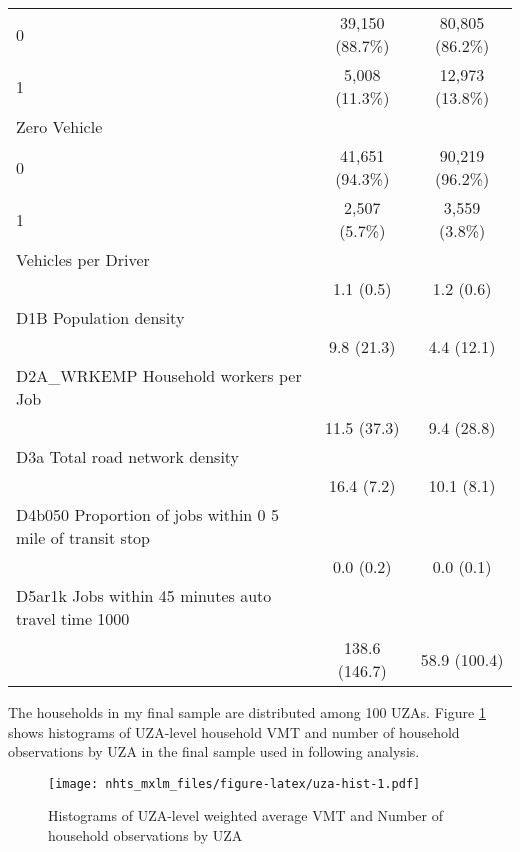 \documentclass[numbered]{trbunofficial}
\begin{document}
\begin{table}[ !h ]
\begin{tabular}{ l c c }
\hspace{6pt}    0 & 39,150 (88.7\%) & 80,805 (86.2\%)\\ 
\hspace{6pt}    1 & 5,008 (11.3\%) & 12,973 (13.8\%)\\ 
Zero Vehicle &   &  \\ 
\hspace{6pt}    0 & 41,651 (94.3\%) & 90,219 (96.2\%)\\ 
\hspace{6pt}    1 & 2,507 (5.7\%) & 3,559 (3.8\%)\\ 
Vehicles per Driver &   &  \\ 
\hspace{6pt}   & 1.1 (0.5) & 1.2 (0.6)\\ 
D1B   Population density &   &  \\ 
\hspace{6pt}   & 9.8 (21.3) & 4.4 (12.1)\\ 
D2A\_WRKEMP   Household workers per Job &   &  \\ 
\hspace{6pt}   & 11.5 (37.3) & 9.4 (28.8)\\ 
D3a   Total road network density &   &  \\ 
\hspace{6pt}   & 16.4 (7.2) & 10.1 (8.1)\\ 
D4b050   Proportion of jobs within 0  5 mile of transit stop &   &  \\ 
\hspace{6pt}   & 0.0 (0.2) & 0.0 (0.1)\\ 
D5ar1k   Jobs within 45 minutes auto travel time  1000 &   &  \\ 
\hspace{6pt}   & 138.6 (146.7) & 58.9 (100.4)\\ 
\bottomrule

\end{tabular}
\end{table}

The households in my final sample are distributed among 100 UZAs. Figure \ref{fig:uza-hist} shows histograms of UZA-level household VMT and number of household observations by UZA in the final sample used in following analysis.

\begin{figure}
\centering
\texttt{[image: nhts\_mxlm\_files/figure-latex/uza-hist-1.pdf]}
\caption{\label{fig:uza-hist}Histograms of UZA-level weighted average VMT and Number of household observations by UZA}
\end{figure}
\end{document}
